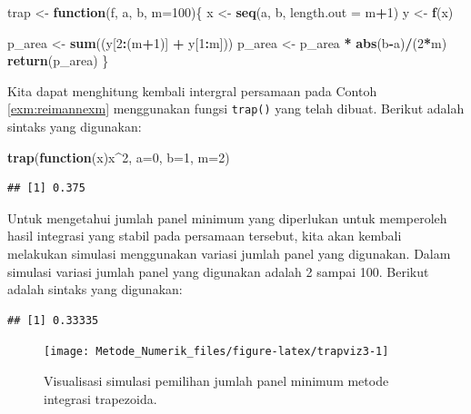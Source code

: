 \documentclass[]{book}
\newenvironment{Shaded}{\begin{snugshade}}{\end{snugshade}}
\newcommand{\ControlFlowTok}[1]{\textcolor[rgb]{0.13,0.29,0.53}{\textbf{#1}}}
\newcommand{\DataTypeTok}[1]{\textcolor[rgb]{0.13,0.29,0.53}{#1}}
\newcommand{\DecValTok}[1]{\textcolor[rgb]{0.00,0.00,0.81}{#1}}
\newcommand{\KeywordTok}[1]{\textcolor[rgb]{0.13,0.29,0.53}{\textbf{#1}}}
\newcommand{\NormalTok}[1]{#1}
\newcommand{\OperatorTok}[1]{\textcolor[rgb]{0.81,0.36,0.00}{\textbf{#1}}}
\newcommand{\StringTok}[1]{\textcolor[rgb]{0.31,0.60,0.02}{#1}}
\theoremstyle{definition}
\theoremstyle{definition}
\theoremstyle{definition}
\theoremstyle{remark}
\begin{document}
\begin{Shaded}
\begin{Highlighting}[]
\NormalTok{trap <-}\StringTok{ }\ControlFlowTok{function}\NormalTok{(f, a, b, }\DataTypeTok{m=}\DecValTok{100}\NormalTok{)\{}
\NormalTok{  x <-}\StringTok{ }\KeywordTok{seq}\NormalTok{(a, b, }\DataTypeTok{length.out =}\NormalTok{ m}\OperatorTok{+}\DecValTok{1}\NormalTok{)}
\NormalTok{  y <-}\StringTok{ }\KeywordTok{f}\NormalTok{(x)}
  
\NormalTok{  p_area <-}\StringTok{ }\KeywordTok{sum}\NormalTok{((y[}\DecValTok{2}\OperatorTok{:}\NormalTok{(m}\OperatorTok{+}\DecValTok{1}\NormalTok{)] }\OperatorTok{+}\StringTok{ }\NormalTok{y[}\DecValTok{1}\OperatorTok{:}\NormalTok{m])) }
\NormalTok{  p_area <-}\StringTok{ }\NormalTok{p_area }\OperatorTok{*}\StringTok{ }\KeywordTok{abs}\NormalTok{(b}\OperatorTok{-}\NormalTok{a)}\OperatorTok{/}\NormalTok{(}\DecValTok{2}\OperatorTok{*}\NormalTok{m)}
  \KeywordTok{return}\NormalTok{(p_area)}
\NormalTok{\}}
\end{Highlighting}
\end{Shaded}

Kita dapat menghitung kembali intergral persamaan pada Contoh \ref{exm:reimannexm} menggunakan fungsi \texttt{trap()} yang telah dibuat. Berikut adalah sintaks yang digunakan:

\begin{Shaded}
\begin{Highlighting}[]
\KeywordTok{trap}\NormalTok{(}\ControlFlowTok{function}\NormalTok{(x)x}\OperatorTok{^}\DecValTok{2}\NormalTok{, }\DataTypeTok{a=}\DecValTok{0}\NormalTok{, }\DataTypeTok{b=}\DecValTok{1}\NormalTok{, }\DataTypeTok{m=}\DecValTok{2}\NormalTok{)}
\end{Highlighting}
\end{Shaded}

\begin{verbatim}
## [1] 0.375
\end{verbatim}

Untuk mengetahui jumlah panel minimum yang diperlukan untuk memperoleh hasil integrasi yang stabil pada persamaan tersebut, kita akan kembali melakukan simulasi menggunakan variasi jumlah panel yang digunakan. Dalam simulasi variasi jumlah panel yang digunakan adalah 2 sampai 100. Berikut adalah sintaks yang digunakan:

\begin{verbatim}
## [1] 0.33335
\end{verbatim}

\begin{figure}

{\centering \texttt{[image: Metode\_Numerik\_files/figure-latex/trapviz3-1]} 

}

\caption{Visualisasi simulasi pemilihan jumlah panel minimum metode integrasi trapezoida.}\label{fig:trapviz3}
\end{figure}
\end{document}
